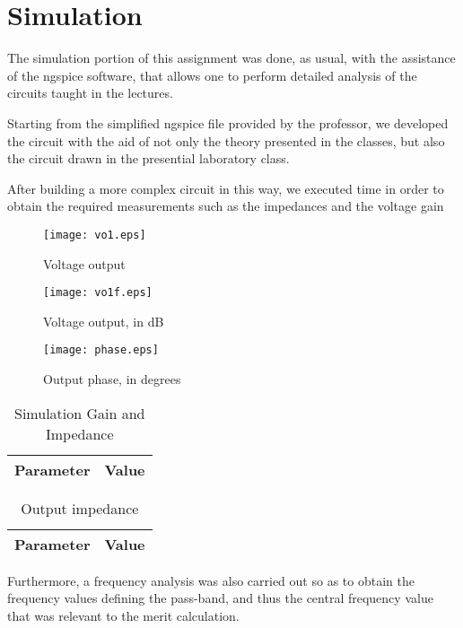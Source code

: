 \section{Simulation}

The simulation portion of this assignment was done, as usual, with the assistance of the ngspice software, that allows one to perform detailed analysis of the circuits taught in the lectures.
\par
Starting from the simplified ngspice file provided by the professor, we developed the circuit with the aid of not only the theory presented in the classes, but also the circuit drawn in the presential laboratory class.
 
After building a more complex circuit in this way, we executed time in order to obtain the required measurements such as the impedances and the voltage gain 
\begin{figure}[h] \centering
\texttt{[image: vo1.eps]}
\caption{ Voltage output }
\end{figure}

\begin{figure}[h] \centering
\texttt{[image: vo1f.eps]}
\caption{ Voltage output, in dB }
\end{figure}

\begin{figure}[h] \centering
\texttt{[image: phase.eps]}
\caption{ Output phase, in degrees}
\end{figure}

\begin{table}[h]
  \centering
  \begin{tabular}{|l|r|}
    \hline    
    {\bf Parameter} & {\bf Value} \\ \hline
    
  \end{tabular}
  \caption{ Simulation Gain and Impedance }
\end{table}

\begin{table}[h]
  \centering
  \begin{tabular}{|l|r|}
    \hline    
    {\bf Parameter} & {\bf Value} \\ \hline
    
  \end{tabular}
  \caption{ Output impedance  }
\end{table}

\par

Furthermore, a frequency analysis was also carried out so as to obtain the frequency values defining the pass-band, and thus the central frequency value that was relevant to the merit calculation.

